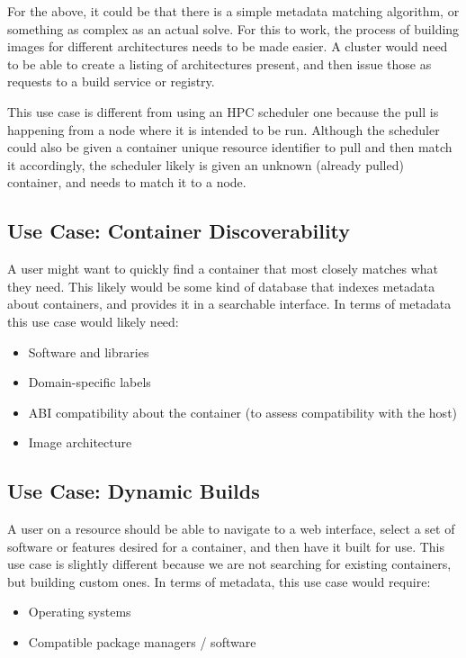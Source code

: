 For the above, it could be that there is a simple metadata matching algorithm, or something as complex as an actual solve.
For this to work, the process of building images for different architectures needs to be made easier. A cluster would need to be able to create a listing of architectures present, and then issue those as requests to a build service or registry.

This use case is different from using an HPC scheduler one because the pull is happening from a node where it is intended to be run. Although the scheduler could also be given a container unique resource identifier to pull and then match it accordingly, the scheduler likely is given an unknown (already pulled) container, and needs to match it to a node.

\subsection{Use Case: Container Discoverability}

A user might want to quickly find a container that most closely matches what they need. This likely would be some kind of database that indexes metadata about containers, and provides it in a searchable interface. In terms of metadata this use case would likely need:

\begin{itemize}
\item Software and libraries
\item Domain-specific labels
\item ABI compatibility about the container (to assess compatibility with the host)
\item Image architecture
\end{itemize}

\subsection{Use Case: Dynamic Builds}

A user on a resource should be able to navigate to a web interface, select a set of software or features desired for a container, and then have it built for use. This use case is slightly different because we are not searching for existing containers, but building custom ones.  In terms of metadata, this use case would require:

\begin{itemize}
\item Operating systems
\item Compatible package managers / software
\end{itemize}

